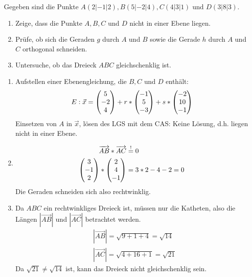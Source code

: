  Gegeben sind die Punkte $A(2|-1|2), B(5|-2|4), C(4|3|1)$ und $D(3|8|3)$. \cas
\begin{enumerate}
	\item Zeige, dass die Punkte $A,B,C$ und $D$ nicht in einer Ebene liegen.
	\item Prüfe, ob sich die Geraden $g$ durch $A$ und $B$ sowie die Gerade $h$ durch $A$ und $C$ orthogonal schneiden.
	\item Untersuche, ob das Dreieck $ABC$ gleichschenklig ist.
\end{enumerate}
\begin{lsg}{}
	\begin{enumerate}
		\item Aufstellen einer Ebenengleichung, die $B,C$ und $D$ enthält:
		\begin{equation*}
			E: \vec x=\begin{pmatrix} 5\\-2\\4 \end{pmatrix}+r*\begin{pmatrix} -1\\5\\-3 \end{pmatrix}+s*\begin{pmatrix} -2\\10\\-1 \end{pmatrix}
		\end{equation*}
		Einsetzen von $A$ in $\vec x$, lösen des LGS mit dem CAS: Keine Lösung, d.h. liegen nicht in einer Ebene.
		\item\begin{align*}
			\overrightarrow{AB}*\overrightarrow{AC}&\overset!=0\\
			\begin{pmatrix} 3\\-1\\2 \end{pmatrix}*\begin{pmatrix} 2\\4\\-1 \end{pmatrix}&=3*2-4-2=0
		\end{align*}
		Die Geraden schneiden sich also rechtwinklig.
		\item Da $ABC$ ein rechtwinkliges Dreieck ist, müssen nur die Katheten, also die Längen $|\overrightarrow{AB}|$ und $|\overrightarrow{AC}|$ betrachtet werden.\begin{align*}
			&|\overrightarrow{AB}|=\sqrt{9+1+4}=\sqrt{14}\\
			&|\overrightarrow{AC}|=\sqrt{4+16+1}=\sqrt{21}
		\end{align*}
		Da $\sqrt{21}\neq \sqrt{14}$ ist, kann das Dreieck nicht gleichschenklig sein.
	\end{enumerate}
\end{lsg}




